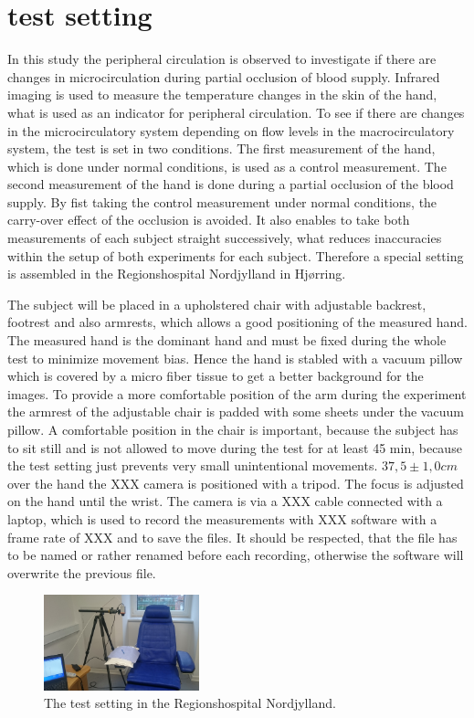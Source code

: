 \chapter{test setting}
In this study the peripheral circulation is observed to investigate if there are changes in microcirculation during partial occlusion of blood supply. Infrared imaging is used to measure the temperature changes in the skin of the hand, what is used as an indicator for peripheral circulation. 
To see if there are changes in the microcirculatory system depending on flow levels in the macrocirculatory system, the test is set in two conditions. The first measurement of the hand, which is done under normal conditions, is used as a control measurement. The second measurement of the hand is done during a partial occlusion of the blood supply. By fist taking the control measurement under normal conditions, the carry-over effect of the occlusion is avoided. It also enables to take both measurements of each subject straight successively, what reduces inaccuracies within the setup of both experiments for each subject. Therefore a special setting is assembled in the Regionshospital Nordjylland in Hj\o{}rring.

The subject will be placed in a upholstered chair with adjustable backrest, footrest and also armrests, which allows a good positioning of the measured hand. The measured hand is the dominant hand and must be fixed during the whole test to minimize movement bias. Hence the hand is stabled with a vacuum pillow which is covered by a micro fiber tissue to get a better background for the images. To provide a more comfortable position of the arm during the experiment the armrest of the adjustable chair is padded with some sheets under the vacuum pillow. A comfortable position in the chair is important, because the subject has to sit still and is not allowed to move during the test for at least 45 min, because the test setting just prevents very small unintentional movements.
$37,5\pm 1,0 cm$ over the hand the XXX camera is positioned with a tripod. The focus is adjusted on the hand until the wrist.
The camera is via a XXX cable connected with a laptop, which is used to record the measurements with XXX software with a frame rate of XXX and to save the files. It should be respected, that the file has to be named or rather renamed before each recording, otherwise the software will overwrite the previous file.

\begin{figure}[H]
	\includegraphics[width=0.4\textwidth]{figures/setting}
	\caption{The test setting in the Regionshospital Nordjylland.}
	\label{fig:FigureLABEL}
\end{figure}

